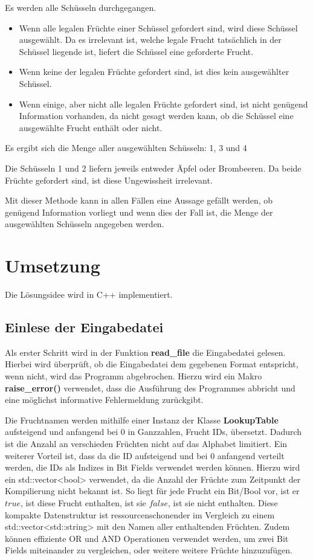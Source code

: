 \documentclass[a4paper,10pt,ngerman]{scrartcl}
\begin{document}
Es werden alle Schüsseln durchgegangen.
\begin{itemize}
    \item Wenn alle legalen Früchte einer Schüssel gefordert sind, wird diese Schüssel ausgewählt.
          Da es irrelevant ist, welche legale Frucht tatsächlich in der Schüssel liegende ist, liefert die Schüssel eine geforderte Frucht.
    \item Wenn keine der legalen Früchte gefordert sind, ist dies kein ausgewählter Schüssel.
    \item Wenn einige, aber nicht alle legalen Früchte gefordert sind, ist nicht genügend Information vorhanden, da nicht gesagt werden kann, ob die Schüssel eine ausgewählte Frucht enthält oder nicht.
\end{itemize}
Es ergibt sich die Menge aller ausgewählten Schüsseln: 1, 3 und 4

Die Schüsseln 1 und 2 liefern jeweils entweder Äpfel oder Brombeeren.
Da beide Früchte gefordert sind, ist diese Ungewissheit irrelevant.

Mit dieser Methode kann in allen Fällen eine Aussage gefällt werden, ob genügend Information vorliegt und wenn dies der Fall ist, die Menge der ausgewählten Schüsseln angegeben werden.

\section{Umsetzung}
Die Lösungsidee wird in C++ implementiert.

\subsection{Einlese der Eingabedatei}
Als erster Schritt wird in der Funktion \textbf{read\_file} die Eingabedatei gelesen.
Hierbei wird überprüft, ob die Eingabedatei dem gegebenen Format entspricht, wenn nicht, wird das Programm abgebrochen.
Hierzu wird ein Makro \textbf{raise\_error()} verwendet, dass die Ausführung des Programmes abbricht und eine möglichst informative Fehlermeldung zurückgibt.

Die Fruchtnamen werden mithilfe einer Instanz der Klasse \textbf{LookupTable} aufsteigend und anfangend bei $0$ in Ganzzahlen, Frucht IDs, übersetzt.
Dadurch ist die Anzahl an verschieden Früchten nicht auf das Alphabet limitiert.
Ein weiterer Vorteil ist, dass da die ID aufsteigend und bei $0$ anfangend verteilt werden, die IDs als Indizes in Bit Fields verwendet werden können.
Hierzu wird ein std::vector<bool> verwendet, da die Anzahl der Früchte zum Zeitpunkt der Kompilierung nicht bekannt ist.
So liegt für jede Frucht ein Bit/Bool vor, ist er $true$, ist diese Frucht enthalten, ist sie $false$, ist sie nicht enthalten.
Diese kompakte Datenstruktur ist ressourcenschonender im Vergleich zu einem std::vector<std::string> mit den Namen aller enthaltenden Früchten.
Zudem können effiziente OR und AND Operationen verwendet werden, um zwei Bit Fields miteinander zu vergleichen, oder weitere weitere Früchte hinzuzufügen.
\end{document}
